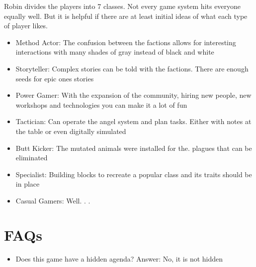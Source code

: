 Robin divides the players into 7 classes. Not every game system hits everyone equally well. But it is helpful if there are at least
initial ideas of what each type of player likes.
\begin{itemize}
\item Method Actor: The confusion between the factions allows for interesting interactions with many shades of gray instead of
black and white
\item Storyteller: Complex stories can be told with the factions. There are enough seeds for epic ones
stories
\item Power Gamer: With the expansion of the community, hiring new people, new workshops and technologies you can make it
a lot of fun
\item Tactician: Can operate the angel system and plan tasks. Either with notes at the table or even
digitally simulated
\item Butt Kicker: The mutated animals were installed for the. plagues that can be eliminated
\item Specialist: Building blocks to recreate a popular class and its traits should be in place
\item Casual Gamers: Well. . .
\end{itemize}

\section{FAQs}
\begin{itemize}
    \item Does this game have a hidden agenda? Answer: No, it is not hidden
\end{itemize}